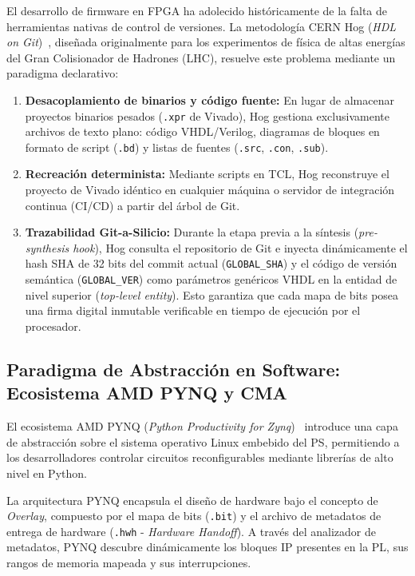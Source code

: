 \documentclass[standalone]{subfiles}
\begin{document}
El desarrollo de firmware en FPGA ha adolecido históricamente de la falta de herramientas nativas de control de versiones. La metodología CERN Hog (\textit{HDL on Git})~\cite{cern_hog}, diseñada originalmente para los experimentos de física de altas energías del Gran Colisionador de Hadrones (LHC), resuelve este problema mediante un paradigma declarativo:

\begin{enumerate}
    \item \textbf{Desacoplamiento de binarios y código fuente:} En lugar de almacenar proyectos binarios pesados (\texttt{.xpr} de Vivado), Hog gestiona exclusivamente archivos de texto plano: código VHDL/Verilog, diagramas de bloques en formato de script (\texttt{.bd}) y listas de fuentes (\texttt{.src}, \texttt{.con}, \texttt{.sub}).
    \item \textbf{Recreación determinista:} Mediante scripts en TCL, Hog reconstruye el proyecto de Vivado idéntico en cualquier máquina o servidor de integración continua (CI/CD) a partir del árbol de Git.
    \item \textbf{Trazabilidad Git-a-Silicio:} Durante la etapa previa a la síntesis (\textit{pre-synthesis hook}), Hog consulta el repositorio de Git e inyecta dinámicamente el hash SHA de 32 bits del commit actual (\texttt{GLOBAL\_SHA}) y el código de versión semántica (\texttt{GLOBAL\_VER}) como parámetros genéricos VHDL en la entidad de nivel superior (\textit{top-level entity}). Esto garantiza que cada mapa de bits posea una firma digital inmutable verificable en tiempo de ejecución por el procesador.
\end{enumerate}

\subsection{Paradigma de Abstracción en Software: Ecosistema AMD PYNQ y CMA}
\label{subsec:teoria_pynq_cma}

El ecosistema AMD PYNQ (\textit{Python Productivity for Zynq})~\cite{pynq_framework} introduce una capa de abstracción sobre el sistema operativo Linux embebido del PS, permitiendo a los desarrolladores controlar circuitos reconfigurables mediante librerías de alto nivel en Python. 

La arquitectura PYNQ encapsula el diseño de hardware bajo el concepto de \textit{Overlay}, compuesto por el mapa de bits (\texttt{.bit}) y el archivo de metadatos de entrega de hardware (\texttt{.hwh} - \textit{Hardware Handoff}). A través del analizador de metadatos, PYNQ descubre dinámicamente los bloques IP presentes en la PL, sus rangos de memoria mapeada y sus interrupciones.
\end{document}

